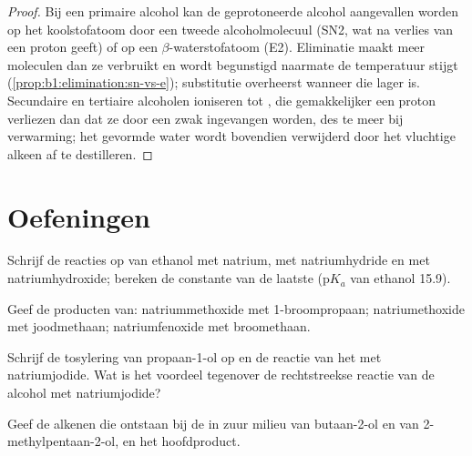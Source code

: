 \begin{proof}
Bij een primaire alcohol kan de geprotoneerde alcohol aangevallen worden
op het koolstofatoom door een tweede alcoholmolecuul (SN2, wat na verlies
van een proton  geeft) of op een $\beta$-waterstofatoom (E2).
Eliminatie maakt meer moleculen dan ze verbruikt en wordt begunstigd
naarmate de temperatuur stijgt (\cref{prop:b1:elimination:sn-vs-e});
substitutie overheerst wanneer die lager is. Secundaire en tertiaire
alcoholen ioniseren tot , die gemakkelijker een proton
verliezen dan dat ze door een zwak  ingevangen worden, des te
meer bij verwarming; het gevormde water wordt bovendien verwijderd door
het vluchtige alkeen af te destilleren.
\end{proof}

\section{Oefeningen}

\begin{exercise}[$\star$]\label{exo:b1:alcohol-activation:1}
Schrijf de reacties op van ethanol met natrium, met natriumhydride en met
natriumhydroxide; bereken de constante van de laatste ($\mathrm{p}K_a$ van
ethanol 15.9).
\end{exercise}

\begin{exercise}[$\star$]\label{exo:b1:alcohol-activation:2}
Geef de producten van: natriummethoxide met 1-broompropaan;
natriumethoxide met joodmethaan; natriumfenoxide met broomethaan.
\end{exercise}

\begin{exercise}[$\star$]\label{exo:b1:alcohol-activation:3}
Schrijf de tosylering van propaan-1-ol op en de reactie van het 
met natriumjodide. Wat is het voordeel tegenover de rechtstreekse reactie
van de alcohol met natriumjodide?
\end{exercise}

\begin{exercise}[$\star$]\label{exo:b1:alcohol-activation:4}
Geef de alkenen die ontstaan bij de  in zuur milieu van
butaan-2-ol en van 2-methylpentaan-2-ol, en het hoofdproduct.
\end{exercise}


